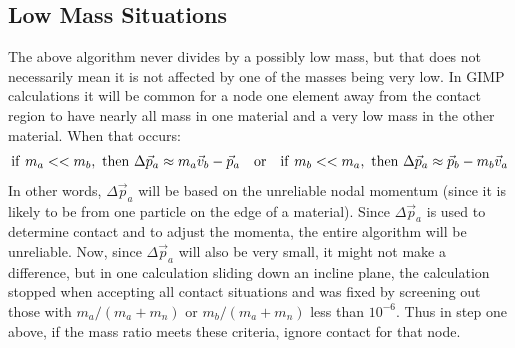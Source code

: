 \documentclass[11pt]{article}
\begin{document}
\subsection{Low Mass Situations}

The above algorithm never divides by a possibly low mass, but that does not necessarily mean it is not affected by one of the masses being very low. In GIMP calculations it will be common for a node one element away from the contact region to have nearly all mass in one material and a very low mass in the other material. When that occurs:
\begin{equation}
         {\rm if\ } m_a << m_b, {\rm\ then\ } \Delta \vec p_a \approx m_a\vec v_b -\vec p_a
         \quad {\rm or}\quad
         {\rm if\ } m_b << m_a, {\rm\ then\ } \Delta \vec p_a \approx \vec p_b - m_b \vec v_a
\end{equation}
In other words, $\Delta\vec p_a$ will be based on the unreliable nodal momentum (since it is likely to be from one particle on the edge of a material). Since $\Delta\vec p_a$ is used to determine contact and to adjust the momenta, the entire algorithm will be unreliable. Now, since $\Delta\vec p_a$ will also be very small, it might not make a difference, but in one calculation sliding down an incline plane, the calculation stopped when accepting all contact situations and was fixed by screening out those with $m_a/(m_a+m_n)$ or $m_b/(m_a+m_n)$ less than $10^{-6}$. Thus in step one above, if the mass ratio meets these criteria, ignore contact for that node.
\end{document}
